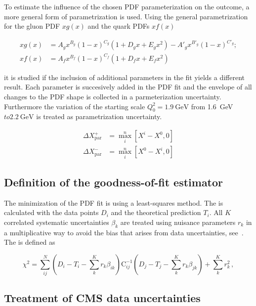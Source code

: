To estimate the influence of the chosen PDF parameterization on the outcome, a
more general form of parametrization is used. Using the general parametrization
for the gluon PDF $xg(x)$ and the quark PDFs $xf(x)$

\begin{align}
   xg(x) &= A_g x^{B_g} (1-x)^{C_g} (1  + D_g x + E_g x^2) - A'_g x^{B'_g} (1-x)^{C'_g};\\
   xf(x) &= A_{f}  x^{B_{f}} (1-x)^{C_{f}} (1 + D_{f}x + E_{f}x^2)
\end{align}

it is studied if the inclusion of additional parameters in the fit yields a
different result. Each parameter is succesively added in the PDF fit and the
envelope of all changes to the PDF shape is collected in a parmeterization
uncertainty. Furthermore the variation of the starting scale $Q_0^2 =
\SI{1.9}{\GeV}$ from \SI{1.6}{\GeV}$ to \SI{2.2}{\GeV}$ is treated as
parametrization uncertainty.

\begin{align*}
  \Delta X^+_{\mathrm{par}} &= \max_{i}^{n} \left[ X^i - X^0, 0 \right]\\
  \Delta X^-_{\mathrm{par}} &= \max_{i}^{n} \left[ X^0 - X^i, 0 \right]
\end{align*}


\subsection{Definition of the goodness-of-fit estimator}
\label{sec:chi2_definition}

The minimization of the PDF fit is using a least-squares method. The \chisq is
calculated with the data points $D_i$ and the theoretical prediction $T_i$. All
$K$ correlated systematic uncertainties $\beta_k$ are treated using nuisance
parameters $r_k$ in a multiplicative way to avoid the bias that arises from data
uncertainties, see~\cite{Lyons:1989gh}. The \chisq is defined as

\begin{equation}
  \chi^2 = \sum_{ij}^N \left(D_i - T_i - \sum_k^K r_k \beta_{ik}\right) \mathrm{C}_{ij}^{-1}
  \left(D_j - T_j - \sum_k^K r_k \beta_{jk} \right) + \sum_k^K r_k^2\,,
  \label{chi2_nuisance}
\end{equation}


\subsection{Treatment of CMS data uncertainties}
\label{section:cmsdatauncertainties}

